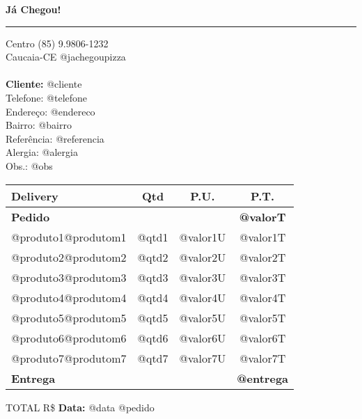 \documentclass{article}
\def \tab {\hspace*{4ex}}
\begin{document}

\hfil{\large \bf Já Chegou!}\hfil %
\bigskip\break %
\hrule %

\noindent Centro \hfill (85) 9.9806-1232 \\ %
Caucaia-CE \hfill @jachegoupizza
\\ \\

{\bf \noindent Cliente:} @cliente \\ %
\noindent \tab Telefone: @telefone \\ %
\tab Endereço: @endereco \\
\tab Bairro: @bairro \\
\tab Referência: @referencia \\
\tab Alergia: @alergia \\
\tab Obs.: @obs\\

\begin{table}[!h]
    \centering
    \begin{tabularx}{\textwidth}{Xccc}
    \hline \textbf{Delivery\hfill} & \textbf{Qtd} & \textbf{P.U.} & \textbf{P.T.} \\
    \hline  \textbf{Pedido}     &       &          & \textbf{@valorT}  \\
            @produto1@produtom1 & @qtd1 & @valor1U & @valor1T \\
            @produto2@produtom2 & @qtd2 & @valor2U & @valor2T \\
            @produto3@produtom3 & @qtd3 & @valor3U & @valor3T \\
            @produto4@produtom4 & @qtd4 & @valor4U & @valor4T \\
            @produto5@produtom5 & @qtd5 & @valor5U & @valor5T \\
            @produto6@produtom6 & @qtd6 & @valor6U & @valor6T \\
            @produto7@produtom7 & @qtd7 & @valor7U & @valor7T \\
            \textbf{Entrega}    &       &          & \textbf{@entrega} \\ \hline
    \end{tabularx}
\end{table}
\hfill{TOTAL R\$ \underline{\hspace{50pt}}}
\vfill {\noindent \bf Data:} @data \hfill @pedido
\end{document}

